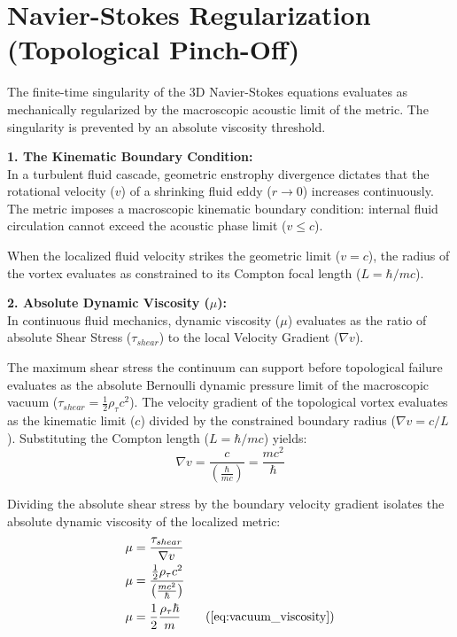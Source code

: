 \documentclass[11pt, a4paper]{article}
\begin{document}
\section{Navier-Stokes Regularization (Topological Pinch-Off)}
\label{sec:deriv_ns_reg}

The finite-time singularity of the 3D Navier-Stokes equations evaluates as mechanically regularized by the macroscopic acoustic limit of the metric. The singularity is prevented by an absolute viscosity threshold.

\textbf{1. The Kinematic Boundary Condition:} \\
In a turbulent fluid cascade, geometric enstrophy divergence dictates that the rotational velocity ($v$) of a shrinking fluid eddy ($r \to 0$) increases continuously. The metric imposes a macroscopic kinematic boundary condition: internal fluid circulation cannot exceed the acoustic phase limit ($v \le c$).

When the localized fluid velocity strikes the geometric limit ($v = c$), the radius of the vortex evaluates as constrained to its Compton focal length ($L = \hbar / m c$). 

\textbf{2. Absolute Dynamic Viscosity ($\mu$):} \\
In continuous fluid mechanics, dynamic viscosity ($\mu$) evaluates as the ratio of absolute Shear Stress ($\tau_{shear}$) to the local Velocity Gradient ($\nabla v$).

The maximum shear stress the continuum can support before topological failure evaluates as the absolute Bernoulli dynamic pressure limit of the macroscopic vacuum ($\tau_{shear} = \frac{1}{2} \rho_{\tau} c^2$). 
The velocity gradient of the topological vortex evaluates as the kinematic limit ($c$) divided by the constrained boundary radius ($\nabla v = c / L$). Substituting the Compton length ($L = \hbar/mc$) yields:
\begin{equation}
    \nabla v = \frac{c}{\left(\frac{\hbar}{mc}\right)} = \frac{mc^2}{\hbar} 
\end{equation}

Dividing the absolute shear stress by the boundary velocity gradient isolates the absolute dynamic viscosity of the localized metric:
\begin{align}
    \mu &= \frac{\tau_{shear}}{\nabla v}  \\
    \mu &= \frac{\frac{1}{2} \rho_{\tau} c^2}{\left( \frac{mc^2}{\hbar} \right)}  \\
    \mu &= \frac{1}{2} \frac{\rho_{\tau} \hbar}{m} \tag{\ref{eq:vacuum_viscosity}}
\end{align}
\end{document}
